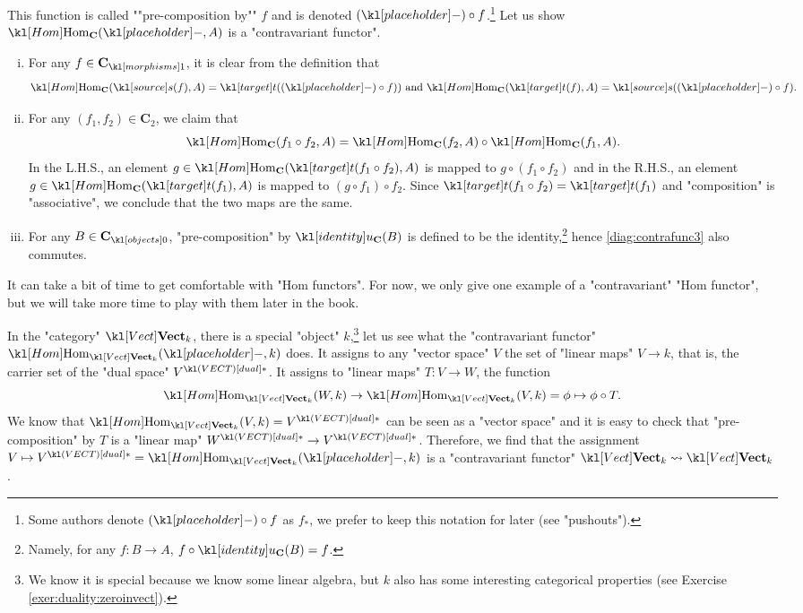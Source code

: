 \documentclass[main.tex]{subfiles}
\begin{document}
\begin{exmp}
\begin{enumerate}
		\AP This function is called ""pre-composition by"" $f$ and is denoted $(\placeholder) \circ f$.\footnote{Some authors denote $(\placeholder) \circ f$ as $f_*$, we prefer to keep this notation for later (see "pushouts").} Let us show $\Hom_{\mathbf{C}}(\placeholder,A)$ is a "contravariant functor".
		\begin{enumerate}[i.]
			\item For any $f \in \mor{\mathbf{C}}$, it is clear from the definition that \[\Hom_{\mathbf{C}}(\source(f),A) = \target((\placeholder) \circ f))\text{ and } \Hom_{\mathbf{C}}(\target(f),A) = \source((\placeholder) \circ f).\]
			\item For any $(f_1,f_2) \in \mathbf{C}_2$, we claim that \[\Hom_{\mathbf{C}}(f_1\circ f_2,A) = \Hom_{\mathbf{C}}(f_2,A)\circ \Hom_{\mathbf{C}}(f_1,A).\] In the L.H.S., an element $g \in \Hom_{\mathbf{C}}(\target(f_1\circ f_2),A)$ is mapped to $g\circ (f_1 \circ f_2)$ and in the R.H.S., an element $g \in \Hom_{\mathbf{C}}(\target(f_1),A)$ is mapped to $(g\circ f_1) \circ f_2$. Since $\target(f_1 \circ f_2) = \target(f_1)$ and "composition" is "associative", we conclude that the two maps are the same.
			\item For any $B \in \obj{\mathbf{C}}$, "pre-composition" by $\idu_{\mathbf{C}}(B)$ is defined to be the identity,\footnote{Namely, for any $f: B \rightarrow A$, $f \circ \idu_{\mathbf{C}}(B) = f$.} hence \eqref{diag:contrafunc3} also commutes.
		\end{enumerate}
	\end{enumerate}
\end{exmp}
It can take a bit of time to get comfortable with "Hom functors". For now, we only give one example of a "contravariant" "Hom functor", but we will take more time to play with them later in the book.
\begin{exmp}
	In the "category" $\catVect{k}$, there is a special "object" $k$,\footnote{We know it is special because we know some linear algebra, but $k$ also has some interesting categorical properties (see Exercise \ref{exer:duality:zeroinvect}).} let us see what the "contravariant functor" $\Hom_{\catVect{k}}(\placeholder, k)$ does. It assigns to any "vector space" $V$ the set of "linear maps" $V \rightarrow k$, that is, the carrier set of the "dual space" $\dual{V}$. It assigns to "linear maps" $T: V \rightarrow W$, the function \[\Hom_{\catVect{k}}(W,k) \rightarrow \Hom_{\catVect{k}}(V,k) = \phi \mapsto \phi \circ T.\]
	We know that $\Hom_{\catVect{k}}(V,k) = \dual{V}$ can be seen as a "vector space" and it is easy to check that "pre-composition" by $T$ is a "linear map" $\dual{W} \rightarrow \dual{V}$. Therefore, we find that the assignment $V \mapsto \dual{V} = \Hom_{\catVect{k}}(\placeholder,k)$ is a "contravariant functor" $\catVect{k} \rightsquigarrow \catVect{k}$.
\end{exmp}
\end{document}
